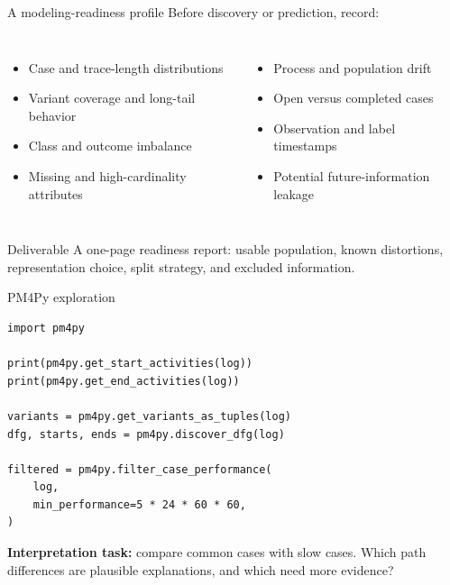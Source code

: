 \documentclass[aspectratio=169,11pt]{beamer}
\begin{document}
\begin{frame}{A modeling-readiness profile}
  Before discovery or prediction, record:
  \begin{columns}[T,onlytextwidth]
      \begin{itemize}
        \item Case and trace-length distributions
        \item Variant coverage and long-tail behavior
        \item Class and outcome imbalance
        \item Missing and high-cardinality attributes
      \end{itemize}
      \begin{itemize}
        \item Process and population drift
        \item Open versus completed cases
        \item Observation and label timestamps
        \item Potential future-information leakage
      \end{itemize}
  \end{columns}
  \vspace{0.4cm}
  \begin{block}{Deliverable}
    A one-page readiness report: usable population, known distortions,
    representation choice, split strategy, and excluded information.
  \end{block}
\end{frame}

\begin{frame}[fragile]{PM4Py exploration}
\begin{lstlisting}[style=python]
import pm4py

print(pm4py.get_start_activities(log))
print(pm4py.get_end_activities(log))

variants = pm4py.get_variants_as_tuples(log)
dfg, starts, ends = pm4py.discover_dfg(log)

filtered = pm4py.filter_case_performance(
    log,
    min_performance=5 * 24 * 60 * 60,
)
\end{lstlisting}
  \vspace{0.15cm}
  \textbf{Interpretation task:} compare common cases with slow cases. Which
  path differences are plausible explanations, and which need more evidence?
\end{frame}

\end{document}
